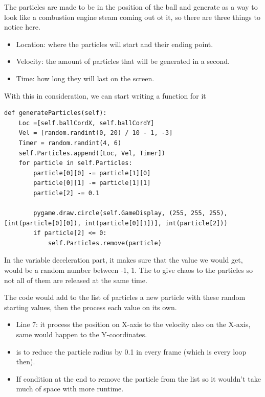 The particles are made to be in the position of the ball and generate as a way to look like a combustion engine steam coming out ot it, so there are three things to notice here.
\begin{itemize}
\item Location: where the particles will start and their ending point.
\item Velocity: the amount of particles that will be generated in a second.
\item Time: how long they will last on the screen.
\end{itemize}

With this in consideration, we can start writing a function for it 

\begin{listing}[H]
	\begin{verbatim}
def generateParticles(self):
	Loc =[self.ballCordX, self.ballCordY] 
	Vel = [random.randint(0, 20) / 10 - 1, -3]
	Timer = random.randint(4, 6)
	self.Particles.append([Loc, Vel, Timer])
	for particle in self.Particles:
		particle[0][0] -= particle[1][0]
		particle[0][1] -= particle[1][1]
		particle[2] -= 0.1
		
		pygame.draw.circle(self.GameDisplay, (255, 255, 255), [int(particle[0][0]), int(particle[0][1])], int(particle[2]))
		if particle[2] <= 0:
			self.Particles.remove(particle)
	\end{verbatim}
\end{listing}

In the  variable deceleration part, it makes sure that the value we would get, would be a random number between {-1, 1}. The  to give chaos to the particles so not all of them are released at the same time.

The code would add to the list of particles a new particle with these random starting values, then the  process each value on its own.

\begin{itemize}
\item Line 7: it process the position on X-axis to the velocity also on the X-axis, same would happen to the Y-coordinates.
\item {} is to reduce the particle radius by 0.1 in every frame (which is every loop then).
\item If condition at the end to remove the particle from the list so it wouldn't take much of space with more runtime.
\end{itemize}


